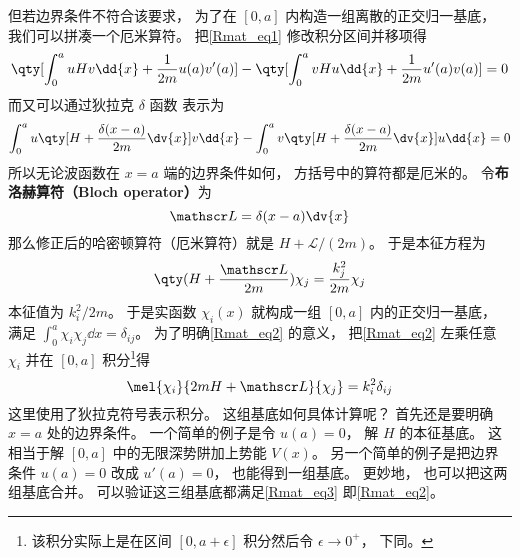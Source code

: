 但若边界条件不符合该要求， 为了在 $[0,a]$ 内构造一组离散的正交归一基底， 我们可以拼凑一个厄米算符。 把\autoref{Rmat_eq1} 修改积分区间并移项得
\begin{equation}
\qty[\int_{0}^{a} uHv\dd{x} + \frac{1}{2m}u(a)v'(a)] - \qty[\int_{0}^{a} vHu\dd{x} + \frac{1}{2m}u'(a)v(a)]
= 0
\end{equation}
而又可以通过狄拉克 $\delta$ 函数 表示为
\begin{equation}
\int_{0}^{a} u\qty[H + \frac{\delta(x-a)}{2m}\dv{x}] v\dd{x} -
\int_{0}^{a} v\qty[H + \frac{\delta(x-a)}{2m}\dv{x}] u\dd{x} = 0
\end{equation}
所以无论波函数在 $x=a$ 端的边界条件如何， 方括号中的算符都是厄米的。 令\textbf{布洛赫算符（Bloch operator）}为
\begin{equation}\label{Rmat_eq6}
\mathscr L = \delta(x-a)\dv{x}
\end{equation}
那么修正后的哈密顿算符（厄米算符）就是 $H + \mathscr L/(2m)$。 于是本征方程为
\begin{equation}\label{Rmat_eq2}
\qty(H + \frac{\mathscr L}{2m})\chi_j = \frac{k_j^2}{2m} \chi_j
\end{equation}
本征值为 ${k_i^2}/{2m}$。 于是实函数 $\chi_i(x)$ 就构成一组 $[0, a]$ 内的正交归一基底， 满足 $\int_0^a \chi_i \chi_j \dd{x} = \delta_{ij}$。 为了明确\autoref{Rmat_eq2} 的意义， 把\autoref{Rmat_eq2} 左乘任意 $\chi_i$ 并在 $[0,a]$ 积分\footnote{该积分实际上是在区间 $[0,a+\epsilon]$ 积分然后令 $\epsilon\to 0^+$， 下同。}得
\begin{equation}\label{Rmat_eq3}
\mel{\chi_i}{2mH + \mathscr L}{\chi_j} = k_i^2 \delta_{ij}
\end{equation}
这里使用了狄拉克符号表示积分。 这组基底如何具体计算呢？ 首先还是要明确 $x=a$ 处的边界条件。 一个简单的例子是令 $u(a) = 0$， 解 $H$ 的本征基底。 这相当于解 $[0,a]$ 中的无限深势阱加上势能 $V(x)$。 另一个简单的例子是把边界条件 $u(a) = 0$ 改成 $u'(a) = 0$， 也能得到一组基底。 更妙地， 也可以把这两组基底合并。 可以验证这三组基底都满足\autoref{Rmat_eq3} 即\autoref{Rmat_eq2}。

